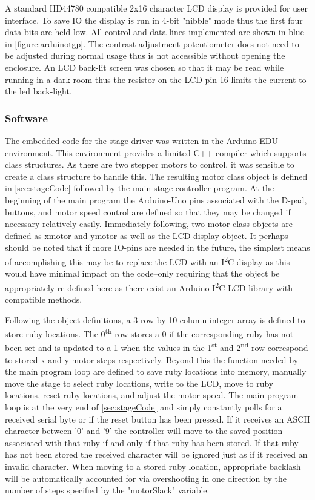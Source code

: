 A standard HD44780 compatible 2x16 character LCD display is provided for user interface.  To save IO the display is run in 4\--bit "nibble" mode thus the first four data bits are held low.  All control and data lines implemented are shown in blue in \fig \ref{figure:arduinotgp}.  The contrast adjustment potentiometer does not need to be adjusted during normal usage thus is not accessible without opening the enclosure.  An LCD back-lit screen was chosen so that it may be read while running in a dark room thus the resistor on the LCD pin 16 limits the current to the led back-light.

\subsubsection{Software}

The embedded code for the stage driver was written in the Arduino EDU environment. This environment provides a limited C++ compiler which supports class structures. As there are two stepper motors to control, it was sensible to create a class structure to handle this.  The resulting motor class object is defined in \sect \ref{sec:stageCode} followed by the main stage controller program.  At the beginning of the main program the Arduino\--Uno pins associated with the D\--pad, buttons, and motor speed control are defined so that they may be changed if necessary relatively easily.  Immediately following, two motor class objects are defined as xmotor and ymotor as well as the LCD display object.  It perhaps should be noted that if more IO\--pins are needed in the future, the simplest means of accomplishing this may be to replace the LCD with an I\textsuperscript{2}C display as this would have minimal impact on the code--only requiring that the object be appropriately re-defined here as there exist an Arduino I\textsuperscript{2}C LCD library with compatible methods. 

Following the object definitions, a 3 row by 10 column integer array is defined to store ruby locations.  The 0\textsuperscript{th} row stores a 0 if the corresponding ruby has not been set and is updated to a 1 when the values in the 1\textsuperscript{st} and 2\textsuperscript{nd} row correspond to stored x and y motor steps respectively.  Beyond this the function needed by the main program loop are defined to save ruby locations into memory, manually move the stage to select ruby locations, write to the LCD, move to ruby locations, reset ruby locations, and adjust the motor speed.  The main program loop is at the very end of \sect \ref{sec:stageCode} and simply constantly polls for a received serial byte or if the reset button has been pressed.  If it receives an ASCII character between '0' and '9' the controller will move to the saved position associated with that ruby if and only if that ruby has been stored.  If that ruby has not been stored the received character will be ignored just as if it received an invalid character.  When moving to a stored ruby location, appropriate backlash will be automatically accounted for via overshooting in one direction by the number of steps specified by the "motorSlack" variable. 

